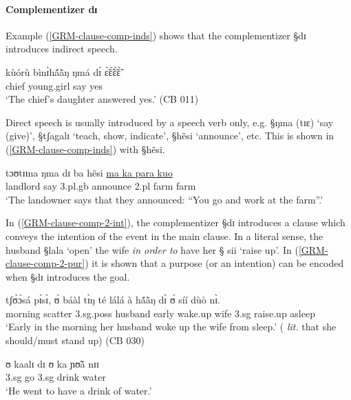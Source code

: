 \paragraph{Complementizer dɪ}
\label{GRM-clause-comp-di}


Example (\ref{GRM-clause-comp-inds}) shows that the complementizer {\S dɪ}
introduces indirect speech. 
\begin{exe}
 \ex\label{GRM-clause-comp-inds}
 \gll  	kùórù 	bìnɪ̀hã́ã̀ŋ        	ŋmá 	dɪ́   	ɛ̃̀ɛ̃́ɛ̃́ɛ̃̀  \\
 chief 	young.girl 	say 	{\comp}  	yes\\
 \glt  `The chief's daughter answered yes.'  (CB 011) 
 \end{exe}


Direct speech is usually introduced by a speech
verb only, e.g. {\S ŋma (tɪɛ)} `say (give)',   {\S tʃagalɪ} `teach, show,
indicate', {\S hẽsi} `announce', etc.  This is shown in 
(\ref{GRM-clause-comp-inds}) with {\S hẽsi}.

\begin{exe}
 \ex\label{GRM-clause-comp-ds}
 \gll tɔʊtɪɪna ŋma dɪ ba hẽsi \underline{ma ka para kuo}\\
 landlord say  {\comp} {\sc 3.pl.g}b  announce {{\sc 2.pl} {\egr} farm farm}\\
 \glt  `The landowner says that they announced:  ``You go and work at the
farm''.' 
 \end{exe}

In (\ref{GRM-clause-comp-2-int}),  the complementizer {\S dɪ} introduces a
clause which conveys the intention of the event in the main clause. In a literal
sense, the husband {\S lala} `open'  the wife {\it in order to} have her {\S
sii} `raise up'. In (\ref{GRM-clause-comp-2-pur}) it is shown that a purpose (or
an intention) can be encoded when {\S dɪ} introduces the goal.



\begin{exe}
 \ex\label{GRM-clause-comp-2}
\begin{xlist}
 \ex\label{GRM-clause-comp-2-int}
\gll  tʃʊ̀ɔ̀sá   pɪ́sɪ̀,    ʊ̀   báàl    tɪ̀ŋ té    lálá    à hã́ã̀ŋ   
 dɪ̀  ʊ́  	     síí 	     dùò 	 nɪ̀.\\
	morning scatter          {\sc 3.sg.poss}	 husband  {\art} 
early  wake.up 
{\art}  wife         {\comp}      {\sc 3.sg}  	     raise.up    asleep	
{\postp} \\
 \glt  `Early in the morning her husband woke up the wife from sleep.' ({\it
lit.} that she should/must stand up)  (CB 030)

 \ex\label{GRM-clause-comp-2-pur}
 \gll ʊ kaalɪ dɪ ʊ ka ɲʊ̃ã nɪɪ   \\
{\sc 3.sg} go   {\comp}  {\sc 3.sg}   {\egr} drink  water  \\
 \glt  `He went to have a drink of water.' 

\end{xlist}
  \end{exe}






